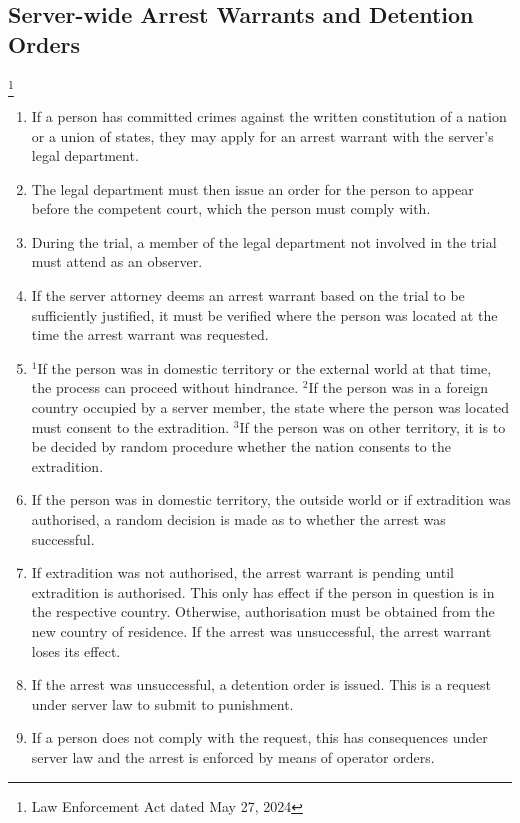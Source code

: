 \documentclass{article}
\begin{document}
\subsection{Server-wide Arrest Warrants and Detention Orders}\footnote{Law Enforcement Act dated May 27, 2024}
\begin{enumerate}[(1)]
    \item If a person has committed crimes against the written constitution of a nation or a union of states, they may apply for an arrest warrant with the server's legal department.
    \item The legal department must then issue an order for the person to appear before the competent court, which the person must comply with.
    \item During the trial, a member of the legal department not involved in the trial must attend as an observer.
    \item If the server attorney deems an arrest warrant based on the trial to be sufficiently justified, it must be verified where the person was located at the time the arrest warrant was requested.
	\item $^{1}$If the person was in domestic territory or the external world at that time, the process can proceed without hindrance. $^{2}$If the person was in a foreign country occupied by a server member, the state where the person was located must consent to the extradition. $^{3}$If the person was on other territory, it is to be decided by random procedure whether the nation consents to the extradition.
	\item If the person was in domestic territory, the outside world or if extradition was authorised, a random decision is made as to whether the arrest was successful.
	\item If extradition was not authorised, the arrest warrant is pending until extradition is authorised. This only has effect if the person in question is in the respective country. Otherwise, authorisation must be obtained from the new country of residence. If the arrest was unsuccessful, the arrest warrant loses its effect.
	\item If the arrest was unsuccessful, a detention order is issued. This is a request under server law to submit to punishment.
	\item If a person does not comply with the request, this has consequences under server law and the arrest is enforced by means of operator orders.
\end{enumerate}
\end{document}

